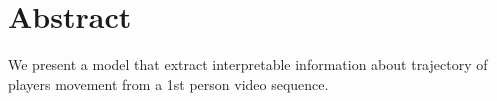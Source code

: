 \chapter{Abstract}

\begin{english}
We present a model that extract interpretable information about trajectory of players movement from a 1st person video sequence.

\end{english}

